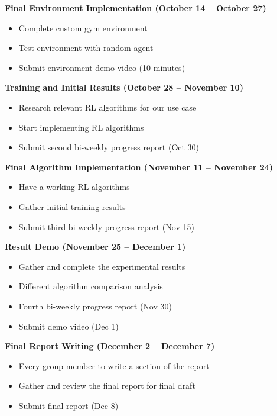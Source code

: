 \documentclass[12pt]{article}
\begin{document}
\textbf{Final Environment Implementation (October 14 -- October 27)}
\begin{itemize}
    \item Complete custom gym environment
    \item Test environment with random agent
    \item Submit environment demo video (10 minutes)
\end{itemize}

\textbf{Training and Initial Results (October 28 -- November 10)}
\begin{itemize}
    \item Research relevant RL algorithms for our use case
    \item Start implementing RL algorithms
    \item Submit second bi-weekly progress report (Oct 30)
\end{itemize}

\textbf{Final Algorithm Implementation (November 11 -- November 24)}
\begin{itemize}
    \item Have a working RL algorithms
    \item Gather initial training results
    \item Submit third bi-weekly progress report (Nov 15)
\end{itemize}

\textbf{Result Demo (November 25 -- December 1)}
\begin{itemize}
    \item Gather and complete the experimental results
    \item Different algorithm comparison analysis
    \item Fourth bi-weekly progress report (Nov 30)
    \item Submit demo video (Dec 1)
\end{itemize}

\textbf{Final Report Writing (December 2 -- December 7)}
\begin{itemize}
    \item Every group member to write a section of the report
    \item Gather and review the final report for final draft
    \item Submit final report (Dec 8)
\end{itemize}

\vspace{0.5em}
\newpage 
\end{document}
